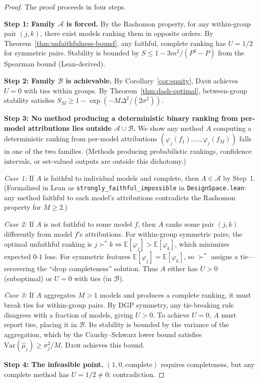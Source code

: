 \documentclass{article}
\newcommand{\E}{\mathbb{E}}
\newcommand{\Var}{\mathrm{Var}}
\newcommand{\DASH}{\textsc{Dash}}
\begin{document}
\begin{proof}
The proof proceeds in four steps.

\textbf{Step 1: Family $\mathcal{A}$ is forced.}
By the Rashomon property, for any within-group pair $(j,k)$, there exist models ranking them in opposite orders. By Theorem~\ref{thm:unfaithfulness-bound}, any faithful, complete ranking has $U = 1/2$ for symmetric pairs. Stability is bounded by $S \leq 1 - 3m^2/(P^3{-}P)$ from the Spearman bound (Lean-derived).

\textbf{Step 2: Family $\mathcal{B}$ is achievable.}
By Corollary~\ref{cor:equity}, \DASH{} achieves $U = 0$ with ties within groups. By Theorem~\ref{thm:dash-optimal}, between-group stability satisfies $S_M \geq 1 - \exp(-M\Delta^2/(2\sigma^2))$.

\textbf{Step 3: No method producing a deterministic binary ranking from per-model attributions lies outside $\mathcal{A} \cup \mathcal{B}$.}
We show any method $A$ computing a deterministic ranking from per-model attributions $(\varphi_j(f_1), \ldots, \varphi_j(f_M))$ falls in one of the two families. (Methods producing probabilistic rankings, confidence intervals, or set-valued outputs are outside this dichotomy.)

\emph{Case 1:} If $A$ is faithful to individual models and complete, then $A \in \mathcal{A}$ by Step~1. (Formalized in Lean as \texttt{strongly\_faithful\_impossible} in \texttt{DesignSpace.lean}: any method faithful to each model's attributions contradicts the Rashomon property for $M \geq 2$.)

\emph{Case 2:} If $A$ is not faithful to some model $f$, then $A$ ranks some pair $(j,k)$ differently from model $f$'s attributions. For within-group symmetric pairs, the optimal unfaithful ranking is $j \succ^* k \Leftrightarrow \E[\varphi_j] > \E[\varphi_k]$, which minimizes expected $0$-$1$ loss. For symmetric features $\E[\varphi_j] = \E[\varphi_k]$, so $\succ^*$ assigns a tie---recovering the ``drop completeness'' solution. Thus $A$ either has $U > 0$ (suboptimal) or $U = 0$ with ties (in $\mathcal{B}$).

\emph{Case 3:} If $A$ aggregates $M > 1$ models and produces a complete ranking, it must break ties for within-group pairs. By DGP symmetry, any tie-breaking rule disagrees with a fraction of models, giving $U > 0$. To achieve $U = 0$, $A$ must report ties, placing it in $\mathcal{B}$. Its stability is bounded by the variance of the aggregation, which by the Cauchy--Schwarz lower bound satisfies $\Var(\hat\mu_j) \geq \sigma_j^2/M$. \DASH{} achieves this bound.

\textbf{Step 4: The infeasible point.}
$(1, 0, \text{complete})$ requires completeness, but any complete method has $U = 1/2 \neq 0$: contradiction.
\end{proof}
\end{document}
